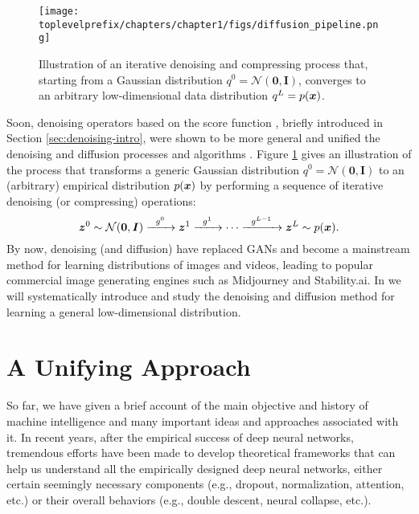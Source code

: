 \documentclass[../../book-main.tex]{subfiles}
\begin{document}
\begin{figure}[t]
    \centering
    \texttt{[image: \\toplevelprefix/chapters/chapter1/figs/diffusion\_pipeline.png]}
    \caption{Illustration of an iterative denoising and compressing process that, starting from a Gaussian distribution $q^0 = \mathcal{N}(\boldsymbol{0}, \boldsymbol{I})$, converges to an arbitrary low-dimensional data distribution $q^L = p(\bm{x})$. }
    \label{fig:diffusion}
\end{figure}

Soon, denoising operators based on the score function \cite{hyvarinen05a}, briefly introduced in Section \ref{sec:denoising-intro}, were shown to be more general and unified the denoising and diffusion processes and algorithms \cite{song2019,song2020score,ho2020denoising}. Figure \ref{fig:diffusion} gives an illustration of the process that transforms a generic Gaussian distribution $q^0 = \mathcal{N}(\boldsymbol{0}, \boldsymbol{I})$ to an (arbitrary) empirical distribution $p(\bm{x})$ by performing a sequence of iterative denoising (or compressing) operations:
\begin{equation}
        \bm{z}^0 \sim  \mathcal{N}(\boldsymbol{0}, \boldsymbol{I})\xrightarrow{\hspace{2mm} g^0  \hspace{2mm}} \bm{z}^1 \xrightarrow{\hspace{2mm} g^1 \hspace{2mm}} \cdots \xrightarrow{\hspace{2mm} g^{L-1}  \hspace{2mm}} \bm{z}^L \sim p(\bm{x}).
\end{equation}
By now, denoising (and diffusion) have replaced GANs and become a mainstream method for learning distributions of images and videos, leading to popular commercial image generating engines such as Midjourney and Stability.ai. 
In  we will systematically introduce and study the denoising and diffusion method for learning a general low-dimensional distribution.  



\section{A Unifying Approach}\label{sec:unifying-approach}
So far, we have given a brief account of the main objective and history of machine intelligence and many important ideas and approaches associated with it. In recent years, after the empirical success of deep neural networks, tremendous efforts have been made to develop theoretical frameworks that can help us understand all the empirically designed deep neural networks, either certain seemingly necessary components (e.g., dropout,  normalization, attention, etc.) or their overall behaviors (e.g., double descent, neural collapse,  etc.). 
\end{document}
